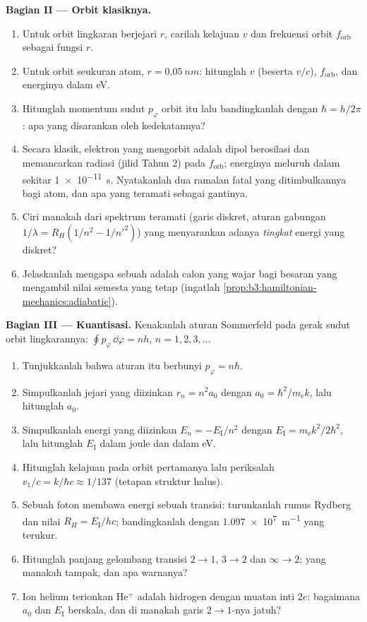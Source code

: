 \begin{problem}
\medskip\noindent\textbf{Bagian II --- Orbit klasiknya.}
\begin{enumerate}[resume]
  \item Untuk orbit lingkaran berjejari $r$, carilah kelajuan $v$ dan
        frekuensi orbit $f_{\text{orb}}$ sebagai fungsi $r$.
  \item Untuk orbit seukuran atom, $r = \qty{0.05}{nm}$: hitunglah $v$
        (beserta $v/c$), $f_{\text{orb}}$, dan energinya dalam eV.
  \item Hitunglah momentum sudut $p_\varphi$ orbit itu lalu
        bandingkanlah dengan $\hbar = h/2\pi$: apa yang disarankan oleh
        kedekatannya?
  \item Secara klasik, elektron yang mengorbit adalah dipol berosilasi
        dan memancarkan radiasi (jilid Tahun 2) pada $f_{\text{orb}}$;
        energinya meluruh dalam sekitar \qty{1e-11}{s}. Nyatakanlah dua
        ramalan fatal yang ditimbulkannya bagi atom, dan apa yang
        teramati sebagai gantinya.
  \item Ciri manakah dari spektrum teramati (garis diskret, aturan
        gabungan $1/\lambda = R_H(1/n^2 - 1/n'^2)$) yang menyarankan
        adanya \emph{tingkat} energi yang diskret?
  \item Jelaskanlah mengapa sebuah \emph{} adalah
        calon yang wajar bagi besaran yang mengambil nilai semesta yang
        tetap (ingatlah \cref{prop:b3:hamiltonian-mechanics:adiabatic}).
\end{enumerate}

\medskip\noindent\textbf{Bagian III --- Kuantisasi.}
Kenakanlah aturan Sommerfeld pada gerak sudut orbit lingkarannya:
$\oint p_\varphi\,\dd\varphi = nh$, $n = 1, 2, 3, \dots$
\begin{enumerate}[resume]
  \item Tunjukkanlah bahwa aturan itu berbunyi $p_\varphi = n\hbar$.
  \item Simpulkanlah jejari yang diizinkan $r_n = n^2a_0$ dengan $a_0 =
        \hbar^2/m_{\text{e}}k$, lalu hitunglah $a_0$.
  \item Simpulkanlah energi yang diizinkan $E_n = -E_{\text{I}}/n^2$ dengan
        $E_{\text{I}} = m_{\text{e}}k^2/2\hbar^2$, lalu hitunglah
        $E_{\text{I}}$ dalam joule dan dalam eV.
  \item Hitunglah kelajuan pada orbit pertamanya lalu periksalah $v_1/c =
        k/\hbar c \approx 1/137$ (tetapan struktur halus).
  \item Sebuah foton membawa energi sebuah transisi: turunkanlah rumus
        Rydberg dan nilai $R_H = E_{\text{I}}/hc$;
        bandingkanlah dengan \qty{1.097e7}{m^{-1}} yang terukur.
  \item Hitunglah panjang gelombang transisi $2 \to 1$,
        $3 \to 2$ dan $\infty \to 2$; yang manakah tampak, dan apa
        warnanya?
  \item Ion helium terionkan He$^+$ adalah hidrogen dengan muatan inti
        $2e$: bagaimana $a_0$ dan $E_{\text{I}}$ berskala, dan di
        manakah garis $2 \to 1$-nya jatuh?
\end{enumerate}


\end{problem}

